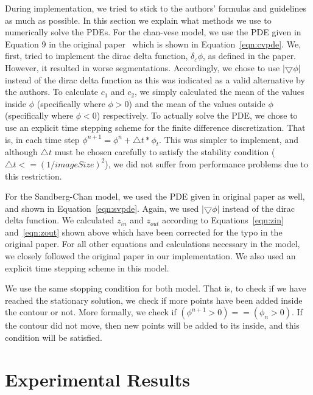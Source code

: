 \documentclass[10pt,twocolumn,letterpaper]{article}
\begin{document}
During implementation, we tried to stick to the authors' formulas and guidelines as much as possible. In this section we explain what methods we use to
numerically solve the PDEs. For the chan-vese model, we use the PDE given in Equation 9 in the original paper~\cite{chan2001active} which is shown in
Equation~\ref{eqn:cvpde}.  We, first, tried to implement the dirac delta function, $\delta_{\varepsilon}\phi$, as defined in the paper. However, it resulted in
worse segmentations. Accordingly, we chose to use $|\bigtriangledown\phi|$ instead of the dirac delta function as this
was indicated as a valid alternative by the authors. To calculate $c_{1}$ and $c_{2}$, we simply calculated the mean of the values inside $\phi$ (specifically
where $\phi > 0$) and the mean of the values outside $\phi$ (specifically where $\phi < 0$) respectively. To actually solve the PDE, we chose to use an explicit
time stepping scheme for the finite difference discretization. That is, in each time step $\phi^{n+1} = \phi^n + \triangle t*\phi_t$. This was simpler to
implement, and although $\triangle t$ must be chosen carefully to satisfy the stability condition ($\triangle t <= (1/imageSize)^2$), we did not suffer from
performance problems due to this restriction.

For the Sandberg-Chan model, we used the PDE given in original paper as well, and shown in Equation~\ref{eqn:svpde}. Again, we used $|\bigtriangledown\phi|$
instead of the dirac delta function. We calculated $z_{in}$ and $z_{out}$ according to Equations~\ref{eqn:zin} and~\ref{eqn:zout} shown above which have been
corrected for
the typo in the original paper. For all other equations and calculations necessary in the model, we closely followed the original paper in our implementation.
We also used an explicit time stepping scheme in this model. 

We use the same stopping condition for both model. That is, to check if we have reached the stationary solution, we check if more points have been added inside
the contour or not. More formally, we check if $(\phi^{n+1} > 0) == (\phi_{n} > 0)$. If the contour did not move, then new points will be added to its inside,
and this condition will be satisfied.


\section{Experimental Results}
\label{sec:results}
\end{document}
